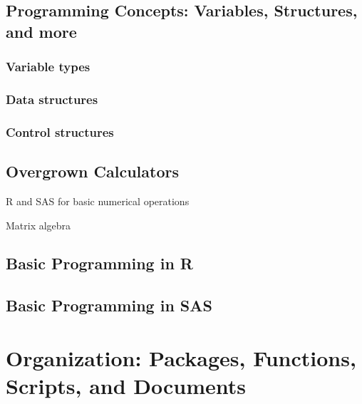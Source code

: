 \documentclass[]{book}
\begin{document}
\hypertarget{programming-concepts-variables-structures-and-more}{%
\section{Programming Concepts: Variables, Structures, and more}\label{programming-concepts-variables-structures-and-more}}

\hypertarget{variable-types}{%
\subsection{Variable types}\label{variable-types}}

\hypertarget{data-structures}{%
\subsection{Data structures}\label{data-structures}}

\hypertarget{control-structures}{%
\subsection{Control structures}\label{control-structures}}

\hypertarget{overgrown-calculators}{%
\section{Overgrown Calculators}\label{overgrown-calculators}}

R and SAS for basic numerical operations

Matrix algebra

\hypertarget{basic-programming-in-r}{%
\section{Basic Programming in R}\label{basic-programming-in-r}}

\hypertarget{basic-programming-in-sas}{%
\section{Basic Programming in SAS}\label{basic-programming-in-sas}}

\hypertarget{organization}{%
\chapter{Organization: Packages, Functions, Scripts, and Documents}\label{organization}}
\end{document}
